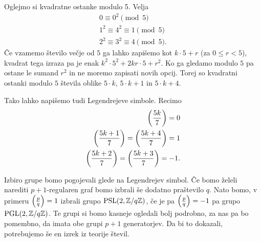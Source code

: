 \begin{primer}
    Oglejmo si kvadratne ostanke modulo 5.
    Velja
    \begin{align*}
        0 \equiv 0^2 \pmod 5            \\
        1^2 \equiv 4^2 \equiv 1 \pmod 5 \\
        2^2 \equiv 3^2 \equiv 4 \pmod 5.
    \end{align*}
    Če vzamemo število večje od \(5\) ga lahko zapišemo kot \(k\cdot 5 + r\) (za \(0\leq r <5\)), kvadrat tega izraza pa je enak \(k^2\cdot 5^2 + 2kr\cdot 5 + r^2\). Ko ga gledamo modulo \(5\) pa ostane le sumand \(r^2\) in ne moremo zapisati novih opcij. Torej so kvadratni ostanki modulo \(5\) števila oblike \(5\cdot k\), \(5\cdot k + 1\) in \(5\cdot k + 4\).

    Tako lahko napišemo tudi Legendrejeve simbole. Recimo
    \begin{align*}
        \left(\frac{5k}{7}\right) = 0                            \\
        \left(\frac{5k + 1}{7}\right) = \left(\frac{5k + 4}{7}\right) = 1 \\
        \left(\frac{5k + 2}{7}\right) = \left(\frac{5k + 3}{7}\right) = -1.
    \end{align*}
\end{primer}

Izbiro grupe bomo pogojevali glede na Legendrejev simbol. Če bomo želeli narediti \(p+1\)-regularen graf bomo izbrali še dodatno praštevilo \(q\). Nato bomo, v primeru \(\left(\frac{p}{q}\right)=1\) izbrali grupo \(\operatorname{PSL}(2, \mathbb Z/q\mathbb Z)\), če je pa \(\left(\frac{p}{q}\right)=-1\) pa grupo \(\operatorname{PGL}(2, \mathbb Z/q\mathbb Z)\). Te grupi si bomo kasneje ogledali bolj podrobno, za nas pa bo pomembno, da imata obe grupi \(p+1\) generatorjev. Da bi to dokazali, potrebujemo še en izrek iz teorije števil\cite{Hirschhorn_1982}.

